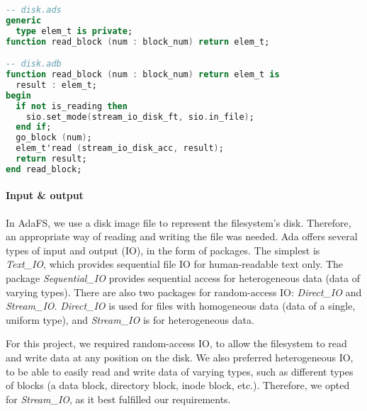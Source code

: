 \begin{lstlisting}[caption={Generic function for reading a block of type \textnormal{elem\_t}}, label={code:generic reading function}, language=Ada]
-- disk.ads
generic
  type elem_t is private;
function read_block (num : block_num) return elem_t;

-- disk.adb
function read_block (num : block_num) return elem_t is
  result : elem_t;
begin
  if not is_reading then
    sio.set_mode(stream_io_disk_ft, sio.in_file);
  end if;
  go_block (num);
  elem_t'read (stream_io_disk_acc, result);
  return result;
end read_block;
\end{lstlisting}

\paragraph{Input \& output}
In AdaFS, we use a disk image file to represent the filesystem's disk.
Therefore, an appropriate way of reading and writing the file was needed.
Ada offers several types of input and output (IO), in the form of packages.
The simplest is \textit{Text\_IO}, which provides sequential file IO for human-readable text only.
The package \textit{Sequential\_IO} provides sequential access for heterogeneous data (data of varying types).
There are also two packages for random-access IO: \textit{Direct\_IO} and \textit{Stream\_IO}.
\textit{Direct\_IO} is used for files with homogeneous data (data of a single, uniform type), and \textit{Stream\_IO} is for heterogeneous data.

For this project, we required random-access IO, to allow the filesystem to read and write data at any position on the disk.
We also preferred heterogeneous IO, to be able to easily read and write data of varying types, such as different types of blocks (a data block, directory block, inode block, etc.).
Therefore, we opted for \textit{Stream\_IO}, as it best fulfilled our requirements.

